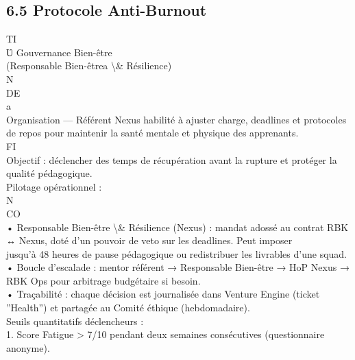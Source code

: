 \subsection{6.5 Protocole Anti-Burnout}
\vspace{0.5em}
\vspace{0.5em}
\vspace{0.5em}
\vspace{0.5em}
TI\\
Ʋ Gouvernance Bien-être\\
(Responsable Bien-êtrea \textbackslash{}& Résilience)\\
\vspace{0.5em}
\vspace{0.5em}
\vspace{0.5em}
\vspace{0.5em}
N\\
DE\\
a\\
Organisation — Référent Nexus habilité à ajuster charge, deadlines et protocoles de repos pour maintenir la santé mentale et physique des apprenants.\\
\vspace{0.5em}
\vspace{0.5em}
\vspace{0.5em}
\vspace{0.5em}
FI\\
Objectif : déclencher des temps de récupération avant la rupture et protéger la qualité pédagogique.\\
Pilotage opérationnel :\\
\vspace{0.5em}
\vspace{0.5em}
N\\
CO\\
• Responsable Bien-être \textbackslash{}& Résilience (Nexus) : mandat adossé au contrat RBK ↔ Nexus, doté d’un pouvoir de veto sur les deadlines. Peut imposer\\
jusqu’à 48 heures de pause pédagogique ou redistribuer les livrables d’une squad.\\
• Boucle d’escalade : mentor référent → Responsable Bien-être → HoP Nexus → RBK Ops pour arbitrage budgétaire si besoin.\\
• Traçabilité : chaque décision est journalisée dans Venture Engine (ticket ”Health”) et partagée au Comité éthique (hebdomadaire).\\
Seuils quantitatifs déclencheurs :\\
1. Score Fatigue \textgreater{} 7/10 pendant deux semaines consécutives (questionnaire anonyme).\\
